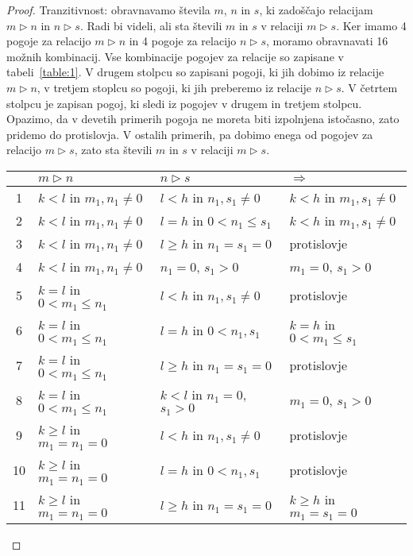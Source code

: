 \documentclass[../TG_magistrsko_delo_sections.tex]{subfiles}
\begin{document}
\begin{proof}
Tranzitivnost: obravnavamo števila $m$,  $n$ in $s$, ki zadoščajo relacijam $m \triangleright n$ in $n \triangleright s$. Radi bi videli, ali sta števili $m$ in $s$ v relaciji $m \triangleright s$. Ker imamo 4 pogoje za relacijo $m \triangleright n$ in 4 pogoje za relacijo $n \triangleright s$, moramo obravnavati 16 možnih kombinacij. Vse kombinacije pogojev za relacije so zapisane v tabeli~\ref{table:1}. V drugem stolpcu so zapisani pogoji, ki jih dobimo iz relacije $m \triangleright n$, v tretjem stoplcu so pogoji, ki jih preberemo iz relacije $n \triangleright s$. V četrtem stolpcu je zapisan pogoj, ki sledi iz pogojev v drugem in tretjem stolpcu. Opazimo, da v devetih primerih pogoja ne moreta biti izpolnjena istočasno, zato pridemo do protislovja. V ostalih primerih, pa dobimo enega od pogojev za relacijo $m \triangleright s$, zato sta števili $m$ in $s$ v relaciji $m \triangleright s$.
\renewcommand{\arraystretch}{1.2}
\begin{table}[h!]
\centering
\begin{tabular}{||c | l | l | l||} 
 \hline
  & $m \triangleright n$ & $n \triangleright s$ & $\Rightarrow$ \\ [0.5ex] 
 \hline\hline
 1 & $k<l$ in $m_1, n_1 \neq 0$ & $l<h$ in $n_1, s_1 \neq 0$ & $k<h$ in $m_1, s_1 \neq 0$ \\ 
 2 & $k<l$ in $m_1, n_1 \neq 0$ & $l=h$ in $0<n_1 \leq s_1$ & $k<h$ in $m_1, s_1 \neq 0$ \\
 3 & $k<l$ in $m_1, n_1 \neq 0$ & $l \geq h$ in $n_1 = s_1 = 0$ & protislovje \\
 4 & $k<l$ in $m_1, n_1 \neq 0$ & $n_1 = 0$, $s_1 > 0$ & $m_1 = 0$, $s_1 > 0$ \\
 5 & $k=l$ in $0<m_1 \leq n_1$ & $l<h$ in $n_1, s_1 \neq 0$ & protislovje \\ 
 6 & $k=l$ in $0<m_1 \leq n_1$ & $l=h$ in $0<n_1, s_1$ & $k=h$ in $0<m_1 \leq s_1$ \\
 7 & $k=l$ in $0<m_1 \leq n_1$ & $l \geq h$ in $n_1 = s_1 = 0$ & protislovje \\
 8 & $k=l$ in $0<m_1 \leq n_1$ & $k<l$ in $n_1 = 0$, $s_1 > 0$ & $m_1 = 0$, $s_1 > 0$ \\
 9 & $k \geq l$ in $m_1 = n_1 = 0$ & $l<h$ in $n_1, s_1 \neq 0$ & protislovje \\ 
 10 & $k \geq l$ in $m_1 = n_1 = 0$ & $l=h$ in $0<n_1, s_1$ & protislovje \\
 11 & $k \geq l$ in $m_1 = n_1 = 0$ & $l \geq h$ in $n_1 = s_1 = 0$ & $k \geq h$ in $m_1 = s_1 = 0$ \\

\end{tabular}
\end{table}
\end{proof}
\end{document}
